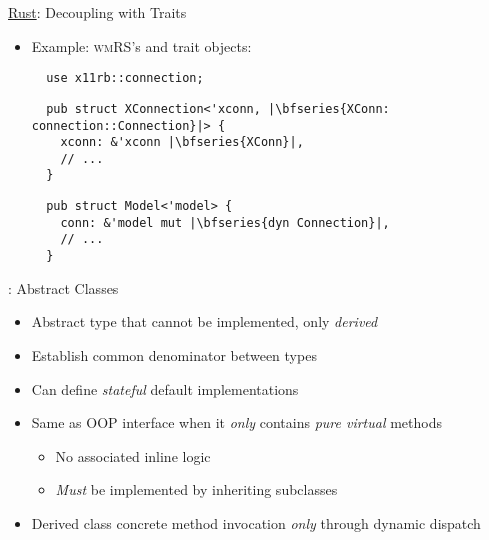 \begin{frame}[fragile]{\underline{Rust}: Decoupling with Traits \hfill {\footnotesize \currentname}}


    \begin{itemize}

        \item Example: \textsc{wmRS}'s  and  trait objects:\\[3pt]
\begin{verbatim}
  use x11rb::connection;
\end{verbatim}
\begin{verbatim}
  pub struct XConnection<'xconn, |\bfseries{XConn: connection::Connection}|> {
    xconn: &'xconn |\bfseries{XConn}|,
    // ...
  }
\end{verbatim}

\begin{verbatim}
  pub struct Model<'model> {
    conn: &'model mut |\bfseries{dyn Connection}|,
    // ...
  }
\end{verbatim}

    \end{itemize}

    \vfill

\end{frame}

\begin{frame}[fragile]{\underline{\cpp}: Abstract Classes \hfill {\footnotesize \currentname}}


    \begin{itemize}

        \item Abstract type that cannot be implemented, only \textit{derived}

        \item Establish common denominator between types

        \item Can define \textit{stateful} default implementations

        \item Same as OOP interface when it \textit{only} contains \textit{pure virtual} methods
            \begin{itemize}
                \item No associated inline logic
                \item \textit{Must} be implemented by inheriting subclasses
            \end{itemize}

        \item Derived class concrete method invocation \textit{only} through dynamic dispatch

    \end{itemize}

    \vfill

\end{frame}

